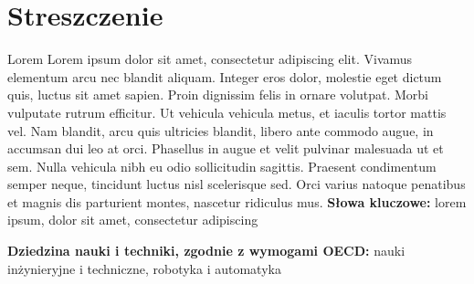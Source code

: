 \chapter*{Streszczenie}
\indent Lorem Lorem ipsum dolor sit amet, consectetur adipiscing elit. Vivamus elementum arcu nec blandit aliquam. Integer eros dolor, molestie eget dictum quis, luctus sit amet sapien. Proin dignissim felis in ornare volutpat. Morbi vulputate rutrum efficitur. Ut vehicula vehicula metus, et iaculis tortor mattis vel. Nam blandit, arcu quis ultricies blandit, libero ante commodo augue, in accumsan dui leo at orci. Phasellus in augue et velit pulvinar malesuada ut et sem. Nulla vehicula nibh eu odio sollicitudin sagittis. Praesent condimentum semper neque, tincidunt luctus nisl scelerisque sed. Orci varius natoque penatibus et magnis dis parturient montes, nascetur ridiculus mus. 
\vspace{0.5cm}\newline
\textbf{Słowa kluczowe:} lorem ipsum, dolor sit amet, consectetur adipiscing\vspace{0.5cm}

\noindent \textbf{Dziedzina nauki i techniki, zgodnie z wymogami OECD:} nauki inżynieryjne i techniczne, robotyka i automatyka
